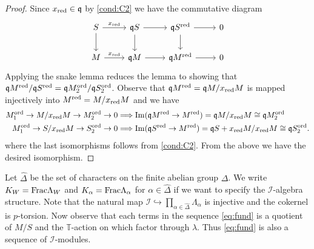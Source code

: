 \documentclass[leqno]{amsart}
\theoremstyle{definition}
\theoremstyle{remark}
\DeclareMathOperator{\Image}{Im}
\newcommand{\fq}{\mathfrak{q}}
\newcommand{\red}{\textnormal{red}}
\newcommand{\xx}{x_\textnormal{red}}
\newcommand{\TT}{\mathbb{T}} %
\newcommand{\I}{\mathcal{I}} %
\newcommand{\ord}{\textnormal{ord}} %
\begin{document}
\begin{proof}
Since $\xx\in \fq$ by \ref{cond:C2}
we have the commutative diagram
\[
\begin{tikzcd}
	S\arrow[r,"\xx"] \arrow[d]
	& \fq S \arrow[r] \arrow[d]
	& \fq S^{\red} \arrow[r] \arrow[d] & 0\\
	M\arrow[r,"\xx"]
	& \fq M \arrow[r]
	& \fq M^{\red} \arrow[r] & 0
\end{tikzcd}
\]
Applying the snake lemma
reduces the lemma to showing that
$\fq M^{\red}/\fq S^{\red}=\fq M_2^{\ord}/\fq S_2^{\ord}$.
Observe that $\fq M^{\red}=\fq M/\xx M$ 
is mapped injectively into $M^{\red}=M/\xx M$ and we have
\begin{align*}
    M_1^{\ord}\to M/\xx M\to M_2^{\ord}\to 0
    &\Longrightarrow
	\Image(\fq M^{\red}\to M^{\red})=
    \fq M/\xx M\cong\fq M_2^{\ord}\\
    M_1^{\ord}\to S/\xx M\to S_2^{\ord}\to 0
    &\Longrightarrow
	\Image(\fq S^{\red}\to M^{\red})=
    \fq S+\xx M/\xx M\cong\fq S_2^{\ord}.
\end{align*}
where the last isomorphisms 
follows from \ref{cond:C2}.
From the above we have the desired isomorphism.
\end{proof}


Let $\hat{\Delta}$ be the set 
of characters on the finite abelian group $\Delta$.
We write $K_W=\textnormal{Frac}\Lambda_W$
and $K_\alpha=\textnormal{Frac}\Lambda_\alpha$
for $\alpha\in \hat{\Delta}$
if we want to specify the $\I$-algebra structure.
Note that the natural map
$\I\hookrightarrow\prod_{\alpha\in\hat{\Delta}}\Lambda_\alpha$ 
is injective and the cokernel is $p$-torsion.
Now observe that each terms in 
the sequence \eqref{eq:fund}
is a quotient of $M/S$ 
and the $\TT$-action on which factor through $\lambda$.
Thus \eqref{eq:fund} is also a sequence of $\I$-modules.
\end{document}
